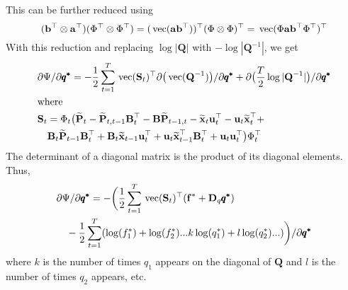 \documentclass[]{article}
\def\BB{\mbox{$\mathbf B$}}	\def\bb{\mbox{$\mathbf b$}}
\def\DD{\mbox{$\mathbf D$}}	\def\dd{\mbox{$\mathbf d$}}
\def\PP{\mbox{$\mathbf P$}}  \def\pp{\mbox{$\mathbf p$}}
\def\QQ{\mbox{$\mathbf Q$}}	 \def\qq{\mbox{$\mathbf q$}}
\def\SS{\mbox{$\mathbf S$}}
\def\vec{\,\textup{\textrm{vec}}}
\def\hatxt{\widetilde{\mbox{$\mathbf x$}}_t}
\def\hatxtm{\widetilde{\mbox{$\mathbf x$}}_{t-1}}
\def\hatPt{\widetilde{\PP}_t}
\def\hatPtm{\widetilde{\PP}_{t-1}}
\def\hatPttm{\widetilde{\PP}_{t,t-1}}
\def\hatPtmt{\widetilde{\PP}_{t-1,t}}
\begin{document}
This can be further reduced using
$$(\bb^\top \otimes \aa^\top)(\Phi^\top \otimes \Phi^\top)=(\vec(\aa\bb^\top))^\top (\Phi \otimes \Phi)^\top = \vec(\Phi \aa\bb^\top \Phi^\top)^\top$$
With this reduction and replacing $\log|\QQ|$ with $-\log|\QQ^{-1}|$, we get
\begin{equation}
\begin{split}
&\partial\Psi/\partial\pmb{q^{*}} = -\frac{1}{2} \sum_{t=1}^T\vec(\SS_t)^\top\partial\big(\vec(\QQ^{-1})\big)/\partial\pmb{q^{*}}
+ \partial\big(\frac{T}{2}\log|\QQ^{-1}| \big)/\partial\pmb{q^{*}} \\
&\text{where }\\
&\SS_t=\Phi_t\big(\hatPt - \hatPttm \BB_t^\top - \BB\hatPtmt 
- \hatxt\uu_t^\top - \uu_t \hatxt^\top + \\
&\quad \BB_t\hatPtm\BB_t^\top + \BB_t\hatxtm\uu_t^\top + \uu_t\hatxtm^\top\BB_t^\top + \uu_t\uu_t^\top \big)\Phi_t^\top
\end{split}
\end{equation}
The determinant of a diagonal matrix is the product of its diagonal elements. Thus,
\begin{equation}\label{eq:Q.gendiag3}
\begin{split}
&\partial\Psi/\partial\pmb{q^{*}}= 
 -\bigg(\frac{1}{2} \sum_{t=1}^T \vec(\SS_t)^\top (\ff^{*} + \DD_q\pmb{q^{*}})  \\
&\quad - \frac{1}{2}\sum_{t=1}^T(\log(f^{*}_1) + \log(f^{*}_2) ... k\log(q^{*}_1) + l\log(q^{*}_2)...)\bigg)/\partial\pmb{q^{*}}\\
\end{split}
\end{equation}
where $k$ is the number of times $q_1$ appears on the diagonal of $\QQ$ and $l$ is the number of times $q_2$ appears, etc.
\end{document}
